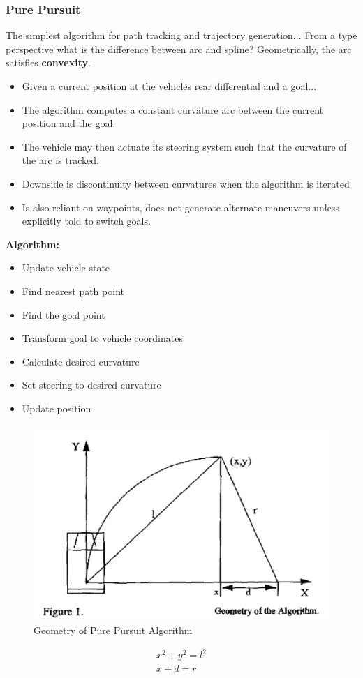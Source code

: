 \documentclass{easychair}
\theoremstyle{theorem}
\theoremstyle{remark}
\begin{document}
\subsubsection{Pure Pursuit}
The simplest algorithm for path tracking and trajectory generation...
From a type perspective what is the difference between arc and spline? 
Geometrically, the arc satisfies \textbf{convexity}. 
\begin{itemize}
	\item Given a current position at the vehicles rear differential and a goal...
	\item The algorithm computes a constant curvature arc between the current position and the goal.
	\item The vehicle may then actuate its steering system such that the curvature of the arc is tracked.
	\item Downside is discontinuity between curvatures when the algorithm is iterated
	\item Is also reliant on waypoints, does not generate alternate maneuvers unless explicitly told to switch goals. 
\end{itemize}
\textbf{Algorithm:}
\begin{itemize}
	\item Update vehicle state
	\item Find nearest path point
	\item Find the goal point
	\item Transform goal to vehicle coordinates
	\item Calculate desired curvature
	\item Set steering to desired curvature
	\item Update position
\end{itemize}
\begin{figure}
	\centering
	\includegraphics[scale=.5]{figures/pure_pursuit_geom}
	\caption{Geometry of Pure Pursuit Algorithm}
\end{figure}
\begin{align}
x^2+y^2=l^2\\
x+d=r
\end{align}
\end{document}
